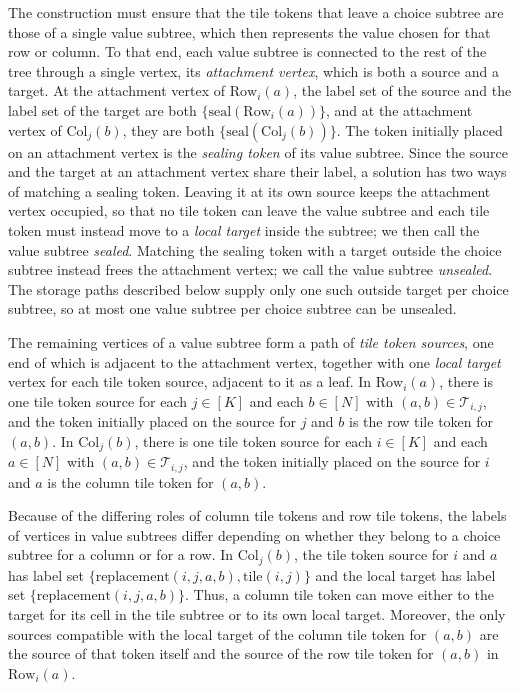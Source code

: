 \documentclass[a4paper,USenglish,thm-restate]{lipics-v2021}
\newcommand{\rowsub}{\mathrm{Row}}
\newcommand{\colsub}{\mathrm{Col}}
\theoremstyle{problemstyle}
\begin{document}
The construction must ensure that the tile tokens that leave a choice
subtree are those of a single value subtree, which then represents the value
chosen for that row or column. To that end, each value subtree is connected
to the rest of the tree through a single vertex, its \emph{attachment
vertex}, which is both a source and a target. At the attachment vertex of
$\rowsub_i(a)$, the label set of the source and the label set of the target
are both $\{\mathrm{seal}(\rowsub_i(a))\}$, and at the attachment vertex of
$\colsub_j(b)$, they are both $\{\mathrm{seal}(\colsub_j(b))\}$. The
token initially placed on an attachment vertex is the \emph{sealing token}
of its value subtree. Since the source and the target at an attachment
vertex share their label, a solution has two ways of matching a sealing
token. Leaving it at its own source keeps the attachment vertex occupied, so
that no tile token can leave the value subtree and each tile token must instead
move to a \emph{local target} inside the subtree; we then call the value
subtree \emph{sealed}. Matching the sealing token with a target outside the
choice subtree instead frees the attachment vertex; we call the value
subtree \emph{unsealed}. The storage paths described below supply only one
such outside target per choice subtree, so at most one value subtree per
choice subtree can be unsealed.

The remaining vertices of a value subtree form a path of \emph{tile token
sources}, one end of which is adjacent to the attachment vertex, together
with one \emph{local target} vertex for each tile token source, adjacent
to it as a leaf. In $\rowsub_i(a)$, there is one tile token source for each $j\in[K]$
and each $b\in[N]$ with $(a,b)\in \mathcal{T}_{i,j}$, and the token
initially placed on the source for $j$ and $b$ is the row tile token for
$(a,b)$. In $\colsub_j(b)$, there is one tile token source for each
$i\in[K]$ and each $a\in[N]$ with $(a,b)\in \mathcal{T}_{i,j}$, and the
token initially placed on the source for $i$ and $a$ is the column tile
token for $(a,b)$.

Because of the differing roles of column tile tokens and row tile tokens,
the labels of vertices in value subtrees differ depending on whether they
belong to a choice subtree for a column or for a row. In $\colsub_j(b)$, the
tile token source for $i$ and $a$ has label set
$\{\mathrm{replacement}(i,j,a,b),\mathrm{tile}(i,j)\}$ and the local target
has label set $\{\mathrm{replacement}(i,j,a,b)\}$. Thus, a column tile token
can move either to the target for its cell in the tile subtree or to its own
local target. Moreover, the only sources compatible with the local target of
the column tile token for $(a,b)$ are the source of that token itself and
the source of the row tile token for $(a,b)$ in $\rowsub_i(a)$.
\end{document}
